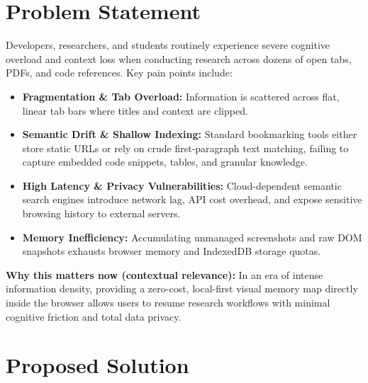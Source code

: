 \documentclass[11pt,a4paper]{article}
\begin{document}
\section{Problem Statement}
Developers, researchers, and students routinely experience severe cognitive overload and context loss when conducting research across dozens of open tabs, PDFs, and code references. Key pain points include:
\begin{itemize}[leftmargin=0.7cm]
    \item \textbf{Fragmentation \& Tab Overload:} Information is scattered across flat, linear tab bars where titles and context are clipped.
    \item \textbf{Semantic Drift \& Shallow Indexing:} Standard bookmarking tools either store static URLs or rely on crude first-paragraph text matching, failing to capture embedded code snippets, tables, and granular knowledge.
    \item \textbf{High Latency \& Privacy Vulnerabilities:} Cloud-dependent semantic search engines introduce network lag, API cost overhead, and expose sensitive browsing history to external servers.
    \item \textbf{Memory Inefficiency:} Accumulating unmanaged screenshots and raw DOM snapshots exhausts browser memory and IndexedDB storage quotas.
\end{itemize}

\textbf{Why this matters now (contextual relevance):} In an era of intense information density, providing a zero-cost, local-first visual memory map directly inside the browser allows users to resume research workflows with minimal cognitive friction and total data privacy.

\section{Proposed Solution}
\end{document}
